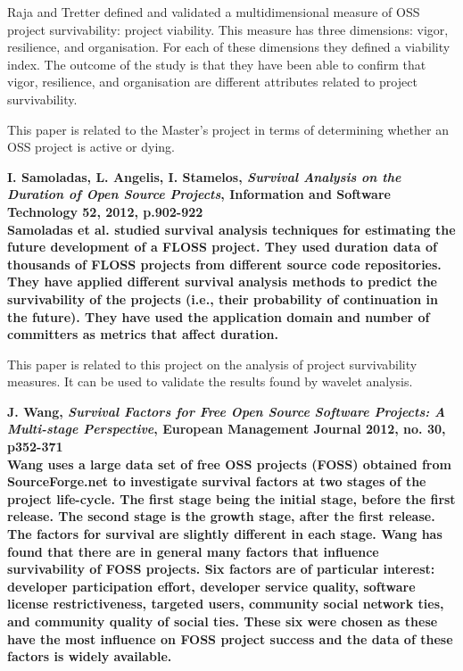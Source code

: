 \begin{thebibliography}{99}
		Raja and Tretter defined and validated a multidimensional measure of OSS
		project survivability: project viability. This measure has three dimensions:
		vigor, resilience, and organisation. For each of these dimensions they defined
		a viability index. The outcome of the study is that they have been able to
		confirm that vigor, resilience, and organisation are different attributes
		related to project survivability.

		This paper is related to the Master's project in terms of determining whether
		an OSS project is active or dying.

	 \bfseries{I. Samoladas, L. Angelis, I. Stamelos,
		\emph{Survival Analysis on the Duration of Open Source Projects}, Information
		and Software Technology 52, 2012, p.902-922}\rm
		\\
		
		Samoladas et al. studied survival analysis techniques for estimating the
		future development of a FLOSS project. They used duration data of thousands of
		FLOSS projects from different source code repositories. They have applied
		different survival analysis methods to predict the survivability of the
		projects (i.e., their probability of continuation in the future). They have
		used the application domain and number of committers as metrics that affect
		duration.

		This paper is related to this project on the analysis of project survivability
		measures. It can be used to validate the results found by wavelet analysis.
	
	 \bfseries{J. Wang, \emph{Survival Factors for Free Open
		Source Software Projects: A Multi-stage Perspective}, European Management
		Journal 2012, no. 30, p352-371}\rm
		\\
		
		Wang uses a large data set of free OSS projects (FOSS) obtained from
		SourceForge.net to investigate survival factors at two stages of the project
		life-cycle. The first stage being the initial stage, before the first release.
		The second stage is the growth stage, after the first release. The factors for
		survival are slightly different in each stage. Wang has found that there are
		in general many factors that influence survivability of FOSS projects. Six
		factors are of particular interest: developer participation effort, developer
		service quality, software license restrictiveness, targeted users, community
		social network ties, and community quality of social ties. These six were
		chosen as these have the most influence on FOSS project success and the data
		of these factors is widely available.
		

\end{thebibliography}
